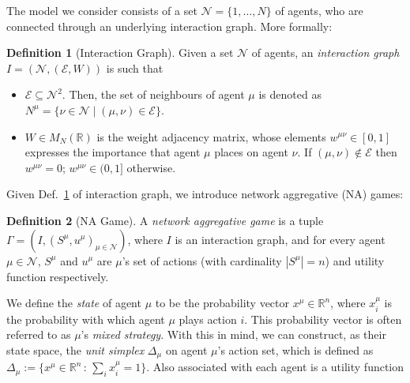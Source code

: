 \documentclass{article}
\theoremstyle{definition}
\newtheorem{definition}{Definition}
\newcommand{\agentset}{\mathcal{N}}
\newcommand{\edgeset}{\mathcal{E}}
\newcommand{\weightset}{W}
\newcommand{\actionset}[1]{S^{#1}}
\newcommand{\utility}[1]{u^{#1}}
\newcommand{\wmunu}{w^{\mu \nu}}
\newcommand{\xmu}{x^{\mu}}
\newcommand{\xmuaction}[1]{x^{\mu}_{#1}}
\begin{document}
The model we consider consists of
a set $\agentset = \{1,
\ldots , N \}$ of agents, who are connected through an underlying
interaction graph.
More formally:
%        
\begin{definition}[Interaction Graph] \label{interactiongraph}
	Given a set $\agentset$ of agents, an {\em interaction graph} $I = (\agentset, (\edgeset,
	\weightset))$ is such that
	\begin{itemize}
		
		\item $\edgeset \subseteq \agentset^2$.  Then, the set of
		neighbours of agent $\mu$ is denoted as $N^\mu = \{\nu \in
		\agentset \mid (\mu, \nu) \in \edgeset\}$.
		
		\item $\weightset \in M_N(\mathbb{R})$ is the weight adjacency matrix, whose elements $w^{\mu
			\nu} \in [0, 1]$ expresses the importance that agent $\mu$ places on agent $\nu$. If $(\mu, \nu) \not
		\in \edgeset$ then $w^{\mu \nu} = 0$;        $\wmunu \in (0, 1]$ otherwise.
	\end{itemize}
\end{definition}

Given Def.~\ref{interactiongraph} of interaction graph,
we introduce network aggregative (NA) games:
%
\begin{definition}[NA Game]
	A {\em network aggregative game} is
	a tuple $\Gamma = (I, (\actionset{\mu},
	\utility{\mu})_{\mu \in \mathcal{N}})$, where $I$ is an
	interaction graph, and for every agent $\mu \in \mathcal{N}$, $\actionset{\mu}$ and $\utility{\mu}$
	are $\mu$'s set of actions (with cardinality $|\actionset{\mu}| = n$)
	and utility function respectively.
\end{definition}

We define the \emph{state} of agent $\mu$ to be the probability
vector $\xmu \in \mathbb{R}^n$, where $\xmu_i$ is the probability
with which agent $\mu$ plays action $i$.
This
probability vector is often referred to as $\mu$'s \emph{mixed
	strategy}. With this in mind, we can construct, as their state
space, the {\em unit simplex} $\Delta_\mu$ on agent $\mu$'s action set, which
is defined
as $\Delta_\mu := \{\xmu \in \mathbb{R}^n \, : \, \sum_i
\xmuaction{i} = 1\}$. Also associated with each agent is a utility
function
\end{document}
